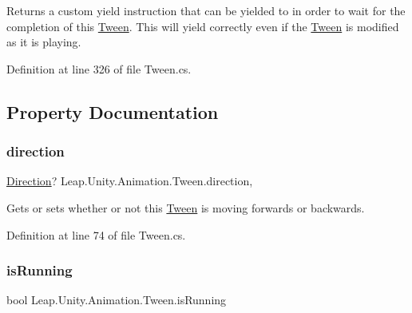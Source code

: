Returns a custom yield instruction that can be yielded to in order to wait for the completion of this \mbox{\hyperlink{struct_leap_1_1_unity_1_1_animation_1_1_tween}{Tween}}. This will yield correctly even if the \mbox{\hyperlink{struct_leap_1_1_unity_1_1_animation_1_1_tween}{Tween}} is modified as it is playing. 



Definition at line 326 of file Tween.\+cs.



\subsection{Property Documentation}
\mbox{\label{struct_leap_1_1_unity_1_1_animation_1_1_tween_ae88d2317428932c7de52a00298005696}} 
\subsubsection{\texorpdfstring{direction}{direction}}
{\footnotesize\ttfamily \mbox{\hyperlink{namespace_leap_1_1_unity_1_1_animation_ab080d4756e4d3d6a2fc9cd9a7f4e695a}{Direction}}? Leap.\+Unity.\+Animation.\+Tween.\+direction\hspace{0.3cm}{\ttfamily [get]}, {\ttfamily [set]}}



Gets or sets whether or not this \mbox{\hyperlink{struct_leap_1_1_unity_1_1_animation_1_1_tween}{Tween}} is moving forwards or backwards. 



Definition at line 74 of file Tween.\+cs.

\mbox{\label{struct_leap_1_1_unity_1_1_animation_1_1_tween_a0af0e03e8197661737ace80ef03636c6}} 
\subsubsection{\texorpdfstring{isRunning}{isRunning}}
{\footnotesize\ttfamily bool Leap.\+Unity.\+Animation.\+Tween.\+is\+Running\hspace{0.3cm}{\ttfamily [get]}}



